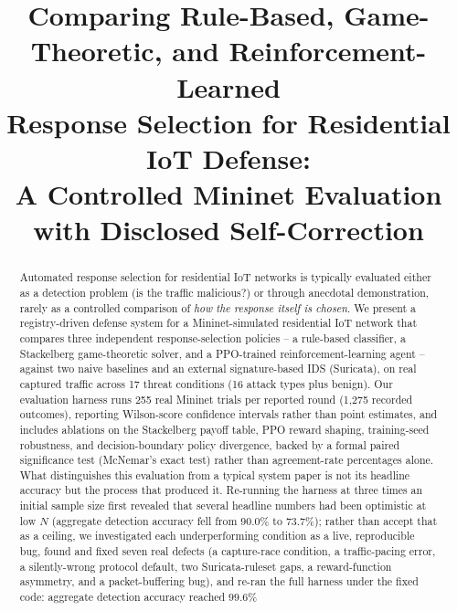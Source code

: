 \documentclass[conference]{IEEEtran}
\begin{document}
\title{Comparing Rule-Based, Game-Theoretic, and Reinforcement-Learned\\
Response Selection for Residential IoT Defense:\\
A Controlled Mininet Evaluation with Disclosed Self-Correction}

\author{
}

\maketitle

\begin{abstract}
Automated response selection for residential IoT networks is typically evaluated either as a
detection problem (is the traffic malicious?) or through anecdotal demonstration, rarely as a
controlled comparison of \emph{how the response itself is chosen}. We present a registry-driven
defense system for a Mininet-simulated residential IoT network that compares three independent
response-selection policies -- a rule-based classifier, a Stackelberg game-theoretic solver, and
a PPO-trained reinforcement-learning agent -- against two naive baselines and an external
signature-based IDS (Suricata), on real captured traffic across 17 threat conditions (16 attack
types plus benign). Our evaluation harness runs 255 real Mininet trials per reported round
(1{,}275 recorded outcomes), reporting Wilson-score confidence intervals rather than point
estimates, and includes ablations on the Stackelberg payoff table, PPO reward shaping,
training-seed robustness, and decision-boundary policy divergence, backed by a formal paired
significance test (McNemar's exact test) rather than agreement-rate percentages alone. What
distinguishes this evaluation from a typical system paper is not its headline accuracy but the
process that produced it. Re-running the harness at three times an initial sample size first
revealed that several headline numbers had been optimistic at low $N$ (aggregate detection
accuracy fell from $90.0\%$ to $73.7\%$); rather than accept that as a ceiling, we investigated
each underperforming condition as a live, reproducible bug, found and fixed seven real defects
(a capture-race condition, a traffic-pacing error, a silently-wrong protocol default, two
Suricata-ruleset gaps, a reward-function asymmetry, and a packet-buffering bug), and re-ran the
full harness under the fixed code: aggregate detection accuracy reached $99.6\%$

\end{abstract}
\end{document}
